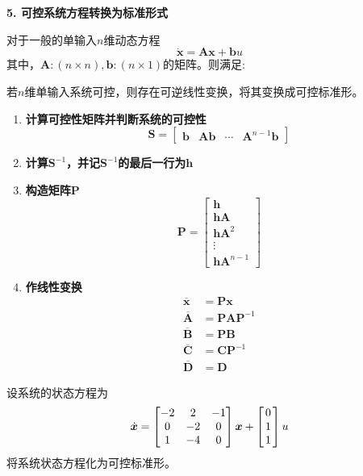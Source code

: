 \noindent \textbf{5. 可控系统方程转换为标准形式}	

对于一般的单输入$n$维动态方程
\begin{equation}
	\dot{\bm{x}} = \bm{Ax} + \bm{b}u
\end{equation}
其中，$\bm{A}:(n \times n), \bm{b}: (n \times 1)$的矩阵。则满足:

若$n$维单输入系统可控，则存在可逆线性变换，将其变换成可控标准形。
\vspace*{0.5em}

\example[可控系统方程转换为标准形式]
\vspace*{-1.5em}
\begin{enumerate}[\textbf{步骤} 1 ]
	\item \textbf{计算可控性矩阵并判断系统的可控性}
	\begin{equation}
		\bm{S} = 
		\begin{bmatrix}
			\bm{b} & \bm{Ab} & \cdots & \bm{A}^{n-1}\bm{b}
		\end{bmatrix} 
	\end{equation}
	\item \textbf{计算$\bm{S}^{-1}$，并记$\bm{S}^{-1}$的最后一行为$\bm{h}$}
	\item \textbf{构造矩阵$\bm{P}$}
	\begin{equation}
		\bm{P} = 
		\begin{bmatrix}
			\bm{h}\\
			\bm{hA}\\
			\bm{hA}^2\\
			\vdots\\
			\bm{hA}^{n-1}
		\end{bmatrix}
	\end{equation}
	\item \textbf{作线性变换}
	\begin{align}
		\overline{\bm{x}} & = \bm{Px}\\
		\overline{\bm{A}} & = \bm{PAP}^{-1}\\
		\overline{\bm{B}} & = \bm{PB}\\
		\overline{\bm{C}} & = \bm{CP}^{-1}\\
		\overline{\bm{D}} & = \bm{D}
	\end{align}
\end{enumerate}

\examples 设系统的状态方程为
\begin{equation*}
	\dot{\bm{x}} = 
	\begin{bmatrix}
		-2 & 2 & -1\\
		0 & -2 & 0\\
		1 & -4 & 0
	\end{bmatrix}
	\bm{x} +
	\begin{bmatrix}
		\hspace*{0.5mm}0\hspace*{0.5mm}\\
		1\\
		1
	\end{bmatrix}
	u
\end{equation*}
将系统状态方程化为可控标准形。

